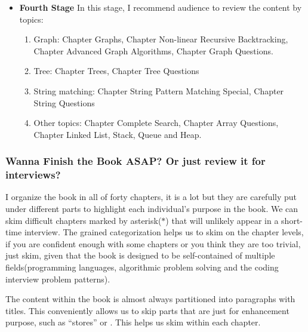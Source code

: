 \documentclass[../main.tex]{subfiles}
\begin{document}
\begin{itemize}
\item \textbf{Fourth Stage}
In this stage, I recommend audience to review the content by topics:
\begin{enumerate}
    \item Graph: Chapter Graphs, Chapter Non-linear Recursive Backtracking, Chapter Advanced Graph Algorithms, Chapter Graph Questions. 
    \item Tree: Chapter Trees, Chapter Tree Questions
    \item String matching: Chapter String Pattern Matching Special, Chapter String Questions
    \item Other topics: Chapter Complete Search, Chapter Array Questions, Chapter Linked List, Stack, Queue and Heap. 
\end{enumerate}
\end{itemize}

\subsubsection{Wanna Finish the Book ASAP? Or just review it for interviews?}  I organize the book in all of forty chapters, it is a lot but they are carefully put under different parts to highlight each individual's purpose in the book. We can skim difficult chapters marked by asterisk($*$) that will unlikely appear in a short-time interview. The grained categorization helps us to skim on the chapter levels, if you are confident enough with some chapters or you think they are too trivial, just skim, given that the book is designed to be self-contained of multiple fields(programming languages, algorithmic problem solving and the coding interview problem patterns). 

The content within the book is almost always partitioned into paragraphs with titles. This conveniently allows us to skip parts that are just for enhancement purpose, such as ``stores'' or . This helps us skim within each chapter. 
\end{document}
